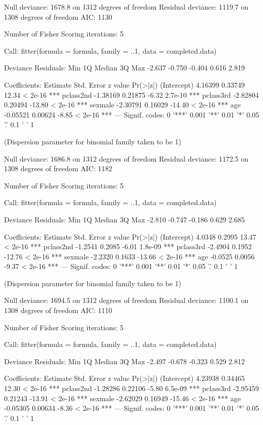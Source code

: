 \begin{Schunk}
\begin{Soutput}
    Null deviance: 1678.8  on 1312  degrees of freedom
Residual deviance: 1119.7  on 1308  degrees of freedom
AIC: 1130

Number of Fisher Scoring iterations: 5


Call:
fitter(formula = formula, family = ..1, data = completed.data)

Deviance Residuals: 
   Min      1Q  Median      3Q     Max  
-2.637  -0.750  -0.404   0.616   2.819  

Coefficients:
            Estimate Std. Error z value Pr(>|z|)    
(Intercept)  4.16399    0.33749   12.34  < 2e-16 ***
pclass2nd   -1.38169    0.21875   -6.32  2.7e-10 ***
pclass3rd   -2.82804    0.20494  -13.80  < 2e-16 ***
sexmale     -2.30791    0.16029  -14.40  < 2e-16 ***
age         -0.05521    0.00624   -8.85  < 2e-16 ***
---
Signif. codes:  0 '***' 0.001 '**' 0.01 '*' 0.05 '.' 0.1 ' ' 1

(Dispersion parameter for binomial family taken to be 1)

    Null deviance: 1686.8  on 1312  degrees of freedom
Residual deviance: 1172.5  on 1308  degrees of freedom
AIC: 1182

Number of Fisher Scoring iterations: 5


Call:
fitter(formula = formula, family = ..1, data = completed.data)

Deviance Residuals: 
   Min      1Q  Median      3Q     Max  
-2.810  -0.747  -0.186   0.629   2.685  

Coefficients:
            Estimate Std. Error z value Pr(>|z|)    
(Intercept)   4.0348     0.2995   13.47  < 2e-16 ***
pclass2nd    -1.2541     0.2085   -6.01  1.8e-09 ***
pclass3rd    -2.4904     0.1952  -12.76  < 2e-16 ***
sexmale      -2.2320     0.1633  -13.66  < 2e-16 ***
age          -0.0525     0.0056   -9.37  < 2e-16 ***
---
Signif. codes:  0 '***' 0.001 '**' 0.01 '*' 0.05 '.' 0.1 ' ' 1

(Dispersion parameter for binomial family taken to be 1)

    Null deviance: 1694.5  on 1312  degrees of freedom
Residual deviance: 1100.1  on 1308  degrees of freedom
AIC: 1110

Number of Fisher Scoring iterations: 5


Call:
fitter(formula = formula, family = ..1, data = completed.data)

Deviance Residuals: 
   Min      1Q  Median      3Q     Max  
-2.497  -0.678  -0.323   0.529   2.812  

Coefficients:
            Estimate Std. Error z value Pr(>|z|)    
(Intercept)  4.23938    0.34465   12.30  < 2e-16 ***
pclass2nd   -1.28286    0.22106   -5.80  6.5e-09 ***
pclass3rd   -2.95459    0.21243  -13.91  < 2e-16 ***
sexmale     -2.62029    0.16949  -15.46  < 2e-16 ***
age         -0.05305    0.00634   -8.36  < 2e-16 ***
---
Signif. codes:  0 '***' 0.001 '**' 0.01 '*' 0.05 '.' 0.1 ' ' 1


\end{Soutput}
\end{Schunk}

